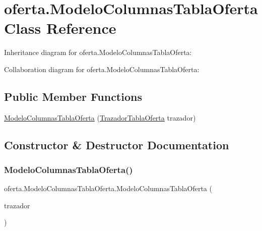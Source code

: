 \hypertarget{classoferta_1_1_modelo_columnas_tabla_oferta}{}\section{oferta.\+Modelo\+Columnas\+Tabla\+Oferta Class Reference}
\label{classoferta_1_1_modelo_columnas_tabla_oferta}


Inheritance diagram for oferta.\+Modelo\+Columnas\+Tabla\+Oferta\+:


Collaboration diagram for oferta.\+Modelo\+Columnas\+Tabla\+Oferta\+:
\subsection*{Public Member Functions}
\begin{DoxyCompactItemize}
\item 
\mbox{\hyperlink{classoferta_1_1_modelo_columnas_tabla_oferta_a515b619b8691023cf601ed3ca2d5d0e5}{Modelo\+Columnas\+Tabla\+Oferta}} (\mbox{\hyperlink{classoferta_1_1_trazador_tabla_oferta}{Trazador\+Tabla\+Oferta}} trazador)
\end{DoxyCompactItemize}


\subsection{Constructor \& Destructor Documentation}
\mbox{\label{classoferta_1_1_modelo_columnas_tabla_oferta_a515b619b8691023cf601ed3ca2d5d0e5}} 
\subsubsection{\texorpdfstring{Modelo\+Columnas\+Tabla\+Oferta()}{ModeloColumnasTablaOferta()}}
{\footnotesize\ttfamily oferta.\+Modelo\+Columnas\+Tabla\+Oferta.\+Modelo\+Columnas\+Tabla\+Oferta (\begin{DoxyParamCaption}\item[{\mbox{\hyperlink{classoferta_1_1_trazador_tabla_oferta}{Trazador\+Tabla\+Oferta}}}]{trazador }\end{DoxyParamCaption})\hspace{0.3cm}{\ttfamily [inline]}}

